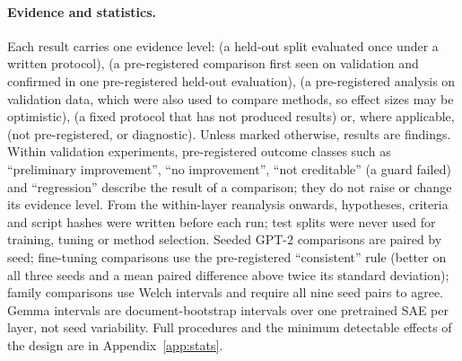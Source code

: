 \paragraph{Evidence and statistics.}\label{sec:evidence} Each result carries one evidence level: 
(a held-out split evaluated once under a written protocol),  (a pre-registered comparison
first seen on validation and confirmed in one pre-registered held-out evaluation),  (a
pre-registered analysis on validation data, which were also used to compare methods, so effect sizes may be
optimistic),  (a fixed protocol that has not produced results) or, where applicable,
 (not pre-registered, or diagnostic). Unless marked otherwise, results are 
findings. Within validation experiments, pre-registered outcome classes such as ``preliminary improvement'', ``no
improvement'', ``not creditable'' (a guard failed) and ``regression'' describe the result of a comparison; they do not
raise or change its evidence level. From the
within-layer reanalysis onwards, hypotheses, criteria and script hashes were written before each run; test splits were
never used for training, tuning or method selection. Seeded GPT-2 comparisons are paired by seed; fine-tuning
comparisons use the pre-registered ``consistent'' rule (better on all three seeds and a mean paired difference above
twice its standard deviation); family comparisons use Welch intervals and require all nine seed pairs to agree.
Gemma intervals are document-bootstrap intervals over one pretrained SAE per layer, not seed variability. Full
procedures and the minimum detectable effects of the design are in Appendix~\ref{app:stats}.
